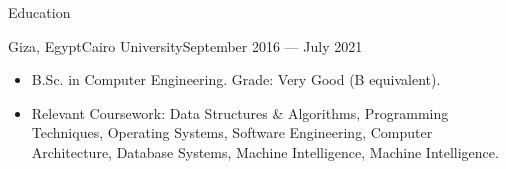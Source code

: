 \documentclass[]{mcdowellcv}
\begin{document}
	\makeheader
	
	
	\begin{cvsection}{Education}
		\begin{cvsubsection}{Giza, Egypt}{Cairo University}{September 2016 — July 2021}
			\begin{itemize}
				\item B.Sc. in Computer Engineering. Grade: Very Good (B equivalent).
				\item Relevant Coursework: Data Structures \& Algorithms, Programming Techniques, Operating Systems, Software Engineering, Computer Architecture, Database Systems, Machine Intelligence, Machine Intelligence.
			\end{itemize}
		\end{cvsubsection}
	\end{cvsection}
	
\end{document}
